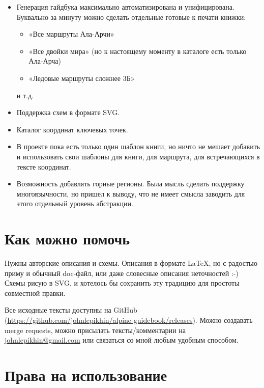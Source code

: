 \documentclass[11pt,fleqn]{report} %
\begin{document}
\begin{itemize}

\item Генерация гайдбука максимально автоматизирована и унифицирована. Буквально за минуту можно сделать отдельные готовые к печати книжки:

  \begin{itemize}
  \item «Все маршруты Ала-Арчи»
  \item «Все двойки мира» (но к настоящему моменту в каталоге есть
    только Ала-Арча)
  \item «Ледовые маршруты сложнее 3Б»
  \end{itemize}
  и т.д.

\item Поддержка схем в формате SVG.
  
\item Каталог координат ключевых точек.

\item В проекте пока есть только один шаблон книги, но ничто не мешает добавить и использовать свои шаблоны для книги, для маршрута, для
  встречающихся в тексте координат.

\item Возможность добавлять горные регионы. Была мысль сделать поддержку многоязычности, но пришел к выводу, что не имеет смысла заводить
  для этого отдельный уровень абстракции.
  
\end{itemize}

\section{Как можно помочь}

Нужны авторские описания и схемы. Описания в формате \LaTeX, но с радостью приму и обычный doc-файл, или даже словесные описания неточностей
:-) Схемы рисую в SVG, и хотелось бы сохранить эту традицию для простоты совместной правки.

Все исходные тексты доступны на GitHub
(\href{https://github.com/johnlepikhin/alpine-guidebook}{https://github.com/johnlepikhin/alpine-guidebook/releases}). Можно создавать merge
requests, можно присылать тексты/комментарии на \href{mailto:johnlepikhin@gmail.com}{johnlepikhin@gmail.com} или связаться со мной любым
удобным способом.

\section{Права на использование}
\end{document}
